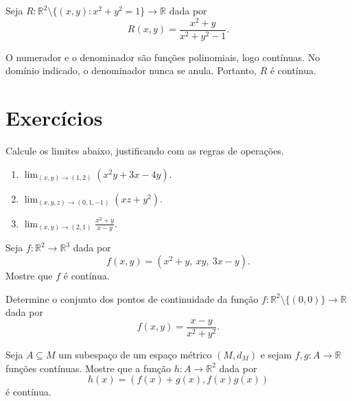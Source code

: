 \begin{example}
    Seja $R:\mathbb R^2\setminus\{(x,y):x^2+y^2=1\}\to\mathbb R$ dada por
    \[
        R(x,y)=\frac{x^2+y}{x^2+y^2-1}.
    \]

    O numerador e o denominador são funções polinomiais, logo contínuas.
    No domínio indicado, o denominador nunca se anula.
    Portanto, $R$ é contínua.
\end{example}

\section*{Exercícios}

\begin{exercise}
    Calcule os limites abaixo, justificando com as regras de operações.
    \begin{enumerate}[label=(\alph*)]
        \item $\displaystyle \lim_{(x,y)\to(1,2)}(x^2y+3x-4y)$.
        \item $\displaystyle \lim_{(x,y,z)\to(0,1,-1)}(xz+y^2)$.
        \item $\displaystyle \lim_{(x,y)\to(2,1)}\frac{x^2+y}{x-y}$.
    \end{enumerate}
\end{exercise}

\begin{exercise}
    Seja $f:\mathbb R^2\to\mathbb R^3$ dada por
    \[
        f(x,y)=(x^2+y,\ xy,\ 3x-y).
    \]
    Mostre que $f$ é contínua.
\end{exercise}

\begin{exercise}
    Determine o conjunto dos pontos de continuidade da função $f:\mathbb R^2\setminus\{(0,0)\}\to\mathbb R$ dada por
    \[
        f(x,y)=\frac{x-y}{x^2+y^2}.
    \]
\end{exercise}

\begin{exercise}
    Seja $A\subseteq M$ um subespaço de um espaço métrico $(M,d_M)$ e sejam $f,g:A\to\mathbb R$ funções contínuas.
    Mostre que a função $h:A\to\mathbb R^2$ dada por
    \[
        h(x)=(f(x)+g(x), f(x)g(x))
    \]
    é contínua.
\end{exercise}
